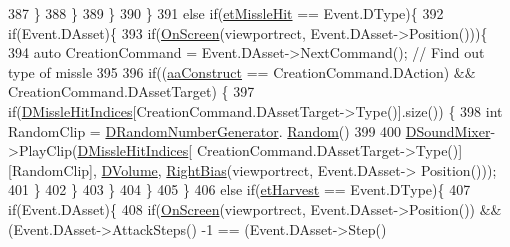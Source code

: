 \begin{DoxyCode}
387                     \}
388                 \}
389             \}
390         \}
391         \textcolor{keywordflow}{else} \textcolor{keywordflow}{if}(\hyperlink{GameModel_8h_abfcf510bafec7c6429906a6ecaac656da0a45453f61b6c27d3e65b3a2f1441cf1}{etMissleHit} == Event.DType)\{
392             \textcolor{keywordflow}{if}(Event.DAsset)\{
393                 \textcolor{keywordflow}{if}(\hyperlink{classCSoundEventRenderer_a9df97d476a3a39cb7126db9c366c2f0c}{OnScreen}(viewportrect, Event.DAsset->Position()))\{
394                     \textcolor{keyword}{auto} CreationCommand = Event.DAsset->NextCommand(); \textcolor{comment}{// Find out type of missle}
395                     
396                     \textcolor{keywordflow}{if}((\hyperlink{GameDataTypes_8h_ab47668e651a3032cfb9c40ea2d60d670a7ef6b863f66dd7dcc95a199cd758ae1d}{aaConstruct} == CreationCommand.DAction) && CreationCommand.DAssetTarget)
      \{
397                         \textcolor{keywordflow}{if}(\hyperlink{classCSoundEventRenderer_aa551953be1c1e7926432996c78c6d8d8}{DMissleHitIndices}[CreationCommand.DAssetTarget->Type()].size())
      \{
398                             \textcolor{keywordtype}{int} RandomClip = \hyperlink{classCSoundEventRenderer_a591b9430a0f6a70259f87a2467de908f}{DRandomNumberGenerator}.
      \hyperlink{classCRandomNumberGenerator_aa7fc51bde5647d15df2f1b9826702ca2}{Random}() %
399                             
400                             \hyperlink{classCSoundEventRenderer_a5abf598a7e8783d9cc78e0d33a65c9c2}{DSoundMixer}->PlayClip(\hyperlink{classCSoundEventRenderer_aa551953be1c1e7926432996c78c6d8d8}{DMissleHitIndices}[
      CreationCommand.DAssetTarget->Type()][RandomClip], \hyperlink{classCSoundEventRenderer_a3812aeb93aef90635a7da72fc101c686}{DVolume}, \hyperlink{classCSoundEventRenderer_a4be5ff09785c55c3b5b6966fb41eb47f}{RightBias}(viewportrect, Event.DAsset->
      Position()));
401                         \}
402                     \}
403                 \}
404             \}
405         \}
406         \textcolor{keywordflow}{else} \textcolor{keywordflow}{if}(\hyperlink{GameModel_8h_abfcf510bafec7c6429906a6ecaac656da1e80f7847f187eaf3f313eab1807c66c}{etHarvest} == Event.DType)\{
407             \textcolor{keywordflow}{if}(Event.DAsset)\{
408                 \textcolor{keywordflow}{if}(\hyperlink{classCSoundEventRenderer_a9df97d476a3a39cb7126db9c366c2f0c}{OnScreen}(viewportrect, Event.DAsset->Position()) && (Event.DAsset->AttackSteps()
      -1 == (Event.DAsset->Step() %

\end{DoxyCode}
